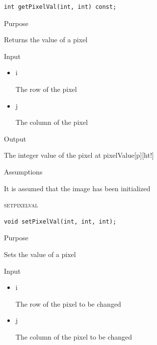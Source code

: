 \documentclass[pdftex, 11pt]{article}
\begin{document}
\begin{description}
\begin{description}
\begin{lstlisting}
int getPixelVal(int, int) const;
\end{lstlisting}

			\item{Purpose}

				Returns the value of a pixel

			\item{Input}

				\begin{itemize}

					\item{i}
					
						The row of the pixel

					\item{j} 

						The column of the pixel

				\end{itemize}

			\item{Output}

				The integer value of the pixel at 
				pixelValue[p][ht!]


			\item{Assumptions}

				It is assumed that the image has been initialized


		\end{description}


	\item{\textsc{setpixelval}}
		\begin{description}

\begin{lstlisting}
void setPixelVal(int, int, int);
\end{lstlisting}

			\item{Purpose}

				Sets the value of a pixel

			\item{Input}

				\begin{itemize}

					\item{i}

						The row of the pixel to be changed

					\item{j}

						The column of the pixel to be changed

				\end{itemize}


\end{description}
\end{description}
\end{document}

